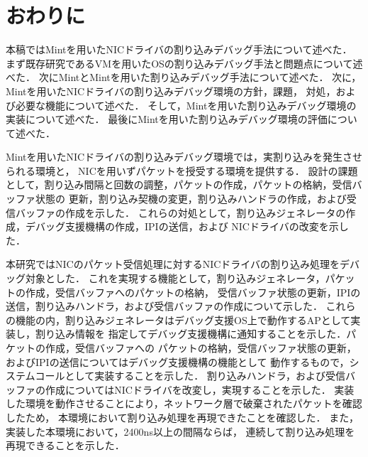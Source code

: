 \documentclass[tanilab-enum]{graduate}
\begin{document}
\chapter{おわりに}\label{conclusion}

本稿ではMintを用いたNICドライバの割り込みデバッグ手法について述べた．
まず既存研究であるVMを用いたOSの割り込みデバッグ手法と問題点について述べた．
次にMintとMintを用いた割り込みデバッグ手法について述べた．
次に，Mintを用いたNICドライバの割り込みデバッグ環境の方針，課題，
対処，および必要な機能について述べた．
そして，Mintを用いた割り込みデバッグ環境の実装について述べた．
最後にMintを用いた割り込みデバッグ環境の評価について述べた．

Mintを用いたNICドライバの割り込みデバッグ環境では，実割り込みを発生させられる環境と，
NICを用いずパケットを授受する環境を提供する．
設計の課題として，割り込み間隔と回数の調整，パケットの作成，パケットの格納，受信バッファ状態の
更新，割り込み契機の変更，割り込みハンドラの作成，および受信バッファの作成を示した．
これらの対処として，割り込みジェネレータの作成，デバッグ支援機構の作成，IPIの送信，および
NICドライバの改変を示した．

本研究ではNICのパケット受信処理に対するNICドライバの割り込み処理をデバッグ対象とした．
これを実現する機能として，割り込みジェネレータ，パケットの作成，受信バッファへのパケットの格納，
受信バッファ状態の更新，IPIの送信，割り込みハンドラ，および受信バッファの作成について示した．
これらの機能の内，割り込みジェネレータはデバッグ支援OS上で動作するAPとして実装し，割り込み情報を
指定してデバッグ支援機構に通知することを示した．パケットの作成，受信バッファへの
パケットの格納，受信バッファ状態の更新，およびIPIの送信についてはデバッグ支援機構の機能として
動作するもので，システムコールとして実装することを示した．
割り込みハンドラ，および受信バッファの作成についてはNICドライバを改変し，実現することを示した．
実装した環境を動作させることにより，ネットワーク層で破棄されたパケットを確認したため，
本環境において割り込み処理を再現できたことを確認した．
また，実装した本環境において，2400ns以上の間隔ならば，
連続して割り込み処理を再現できることを示した．
\end{document}
